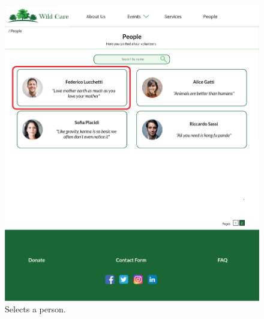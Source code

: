 	\begin{figure}[h!]
		\centering
		\begin{minipage}[b]{1\textwidth}
    			\includegraphics[width=\textwidth]{./assets/mockups/people_persondetails.png}
			\caption{Selects a person.}
		\end{minipage}
	\end{figure}

